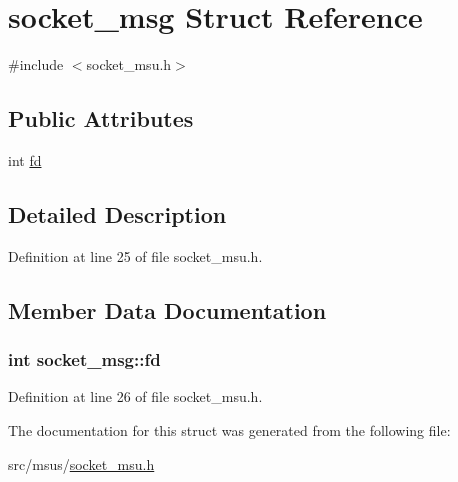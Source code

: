 \hypertarget{structsocket__msg}{\section{socket\-\_\-msg Struct Reference}
\label{structsocket__msg}
}


{\ttfamily \#include $<$socket\-\_\-msu.\-h$>$}

\subsection*{Public Attributes}
\begin{DoxyCompactItemize}
\item 
int \hyperlink{structsocket__msg_a4c30ca4c5a5cfa381a6f7b3e256ca0aa}{fd}
\end{DoxyCompactItemize}


\subsection{Detailed Description}


Definition at line 25 of file socket\-\_\-msu.\-h.



\subsection{Member Data Documentation}
\hypertarget{structsocket__msg_a4c30ca4c5a5cfa381a6f7b3e256ca0aa}{
\subsubsection[{fd}]{\setlength{\rightskip}{0pt plus 5cm}int socket\-\_\-msg\-::fd}}\label{structsocket__msg_a4c30ca4c5a5cfa381a6f7b3e256ca0aa}


Definition at line 26 of file socket\-\_\-msu.\-h.



The documentation for this struct was generated from the following file\-:\begin{DoxyCompactItemize}
\item 
src/msus/\hyperlink{socket__msu_8h}{socket\-\_\-msu.\-h}\end{DoxyCompactItemize}

